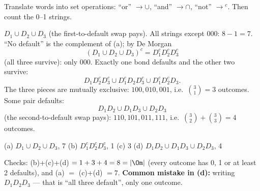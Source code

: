 \begin{solution}
	\idea Translate words into set operations: ``or'' $\to\cup$, ``and''
	$\to\cap$, ``not'' $\to{}^c$. Then count the 0--1 strings.

	 $D_1\cup D_2\cup D_3$ (the first-to-default swap pays). All
	strings except $000$: $8-1=7$.
	 ``No default'' is the complement of (a); by De Morgan
	\[ (D_1\cup D_2\cup D_3)^c=D_1^cD_2^cD_3^c \]
	(all three survive): only $000$.
	 Exactly one bond defaults and the other two survive:
	\[ D_1D_2^cD_3^c\cup D_1^cD_2D_3^c\cup D_1^cD_2^cD_3. \]
	The three pieces are
	mutually exclusive: $100,010,001$, i.e.\ $\binom31=3$ outcomes.
	 Some pair defaults:
	\[ D_1D_2\cup D_1D_3\cup D_2D_3 \]
	(the second-to-default swap pays): $110,101,011,111$, i.e.\
	$\binom32+\binom33=4$ outcomes.
	\begin{answer}
		(a) $D_1\cup D_2\cup D_3$, 7 \quad (b) $D_1^cD_2^cD_3^c$, 1 \quad
		(c) 3 \quad (d) $D_1D_2\cup D_1D_3\cup D_2D_3$, 4
	\end{answer}
	\begin{remark}
		Checks: (b)+(c)+(d) $=1+3+4=8=|\Om|$ (every outcome has 0, 1 or at least 2
		defaults), and (a) $=$ (c)+(d) $=7$. \textbf{Common mistake in (d):}
		writing $D_1D_2D_3$ --- that is ``all three default'', only one outcome.
	\end{remark}
\end{solution}

